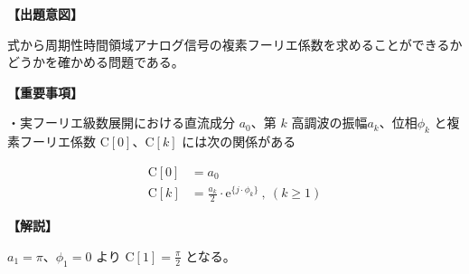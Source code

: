 \noindent \textbf{【出題意図】}

\bigskip
\noindent 式から周期性時間領域アナログ信号の複素フーリエ係数を求めることができるかどうかを確かめる問題である。

\vspace{1em}
\noindent \textbf{【重要事項】}

\medskip
\noindent・実フーリエ級数展開における直流成分 $a_0$、第 $k$ 高調波の振幅$a_k$、位相$\phi_k$ と複素フーリエ係数 $\textrm{C}[0]$、$\textrm{C}[k]$ には次の関係がある

\begin{align*}
\textrm{C}[0] &= a_0 \\
\textrm{C}[k] &= \frac{a_k}{2} \cdot \textrm{e}^{\{j \cdot \phi_k \}} \ ,\ (k\geq 1)
\end{align*}


\bigskip

\vspace{1em}
\noindent \textbf{【解説】}

\bigskip
\noindent $a_1 = \pi$、$\phi_1 = 0$ より $\textrm{C}[1] = \frac{\pi}{2}$ となる。
